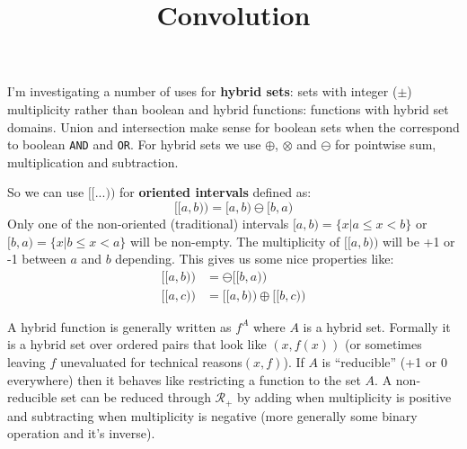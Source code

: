 \documentclass{letter}
\title{Convolution}
\begin{document}
	I'm investigating a number of uses for \textbf{hybrid sets}: sets with integer ($\pm$) multiplicity rather than boolean
	and hybrid functions: functions with hybrid set domains.
	Union and intersection make sense for boolean sets when the correspond to boolean \texttt{AND} and \texttt{OR}.
	For hybrid sets we use $\oplus$, $\otimes$ and $\ominus$ for pointwise sum, multiplication and subtraction.

	So we can use $[\![ ... )\!)$ for \textbf{oriented intervals} defined as:
	\begin{equation}
		[\![a,b)\!) = [a,b) \ominus [b,a)
	\end{equation}
	Only one of the non-oriented (traditional) intervals  $[a,b) = \{ x | a \leq x < b\}$ or $[b,a) = \{ x | b \leq x < a \}$ 
	will be non-empty.
	The multiplicity of $[\![a,b)\!)$ will be +1 or -1 between $a$ and $b$ depending.
	This gives us some nice properties like:
	\begin{align}
		[\![a,b)\!) &= \ominus [\![b,a)\!) \\
		[\![a,c)\!) &= [\![a,b)\!) \oplus [\![b,c)\!)
	\end{align}
	
	A hybrid function is generally written as $f^A$ where $A$ is a hybrid set.
	Formally it is a hybrid set over ordered pairs that look like $(x,f(x))$ (or sometimes leaving $f$ unevaluated for 
	technical reasons$(x,f)$).
	If $A$ is ``reducible'' (+1 or 0 everywhere) then it behaves like restricting a function to the set $A$.
	A non-reducible set can be reduced through $\mathcal{R}_+$ by adding when multiplicity is positive and subtracting
	when multiplicity is negative (more generally some binary operation and it's inverse).
\end{document}
